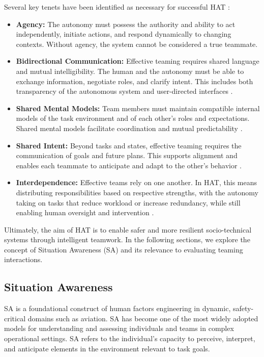 \documentclass[12pt,a4paper]{article} %
\begin{document}
	Several key tenets have been identified as necessary for successful HAT \parencite{wynne_integrative_2018}:

	\begin{itemize}
		\item \textbf{Agency:} The autonomy must possess the authority and ability to act independently, initiate actions, and respond dynamically to changing contexts. Without agency, the system cannot be considered a true teammate.
		
		\item \textbf{Bidirectional Communication:} Effective teaming requires shared language and mutual intelligibility. The human and the autonomy must be able to exchange information, negotiate roles, and clarify intent. This includes both transparency of the autonomous system and user-directed interfaces \parencite{christoffersen_1_2002,liu_cognitive_2016}.
		
		\item \textbf{Shared Mental Models:} Team members must maintain compatible internal models of the task environment and of each other's roles and expectations. Shared mental models facilitate coordination and mutual predictability \parencite{cooke_interactive_2013,liu_cognitive_2016}.
		
		\item \textbf{Shared Intent:} Beyond tasks and states, effective teaming requires the communication of goals and future plans. This supports alignment and enables each teammate to anticipate and adapt to the other's behavior \parencite{lyons_humanautonomy_2021,endsley_ironies_2023}.
		
		\item \textbf{Interdependence:} Effective teams rely on one another. In HAT, this means distributing responsibilities based on respective strengths, with the autonomy taking on tasks that reduce workload or increase redundancy, while still enabling human oversight and intervention \parencite{lawless_editorial_2023,johnson_no_2019}.
	\end{itemize}

	Ultimately, the aim of HAT is to enable safer and more resilient socio-technical systems through intelligent teamwork. In the following sections, we explore the concept of Situation Awareness (SA) and its relevance to evaluating teaming interactions.

	\subsection{Situation Awareness}
	SA is a foundational construct of human factors engineering in dynamic, safety-critical domains such as aviation. SA has become one of the most widely adopted models for understanding and assessing individuals and teams in complex operational settings. SA refers to the individual's capacity to perceive, interpret, and anticipate elements in the environment relevant to task goals.
\end{document}
